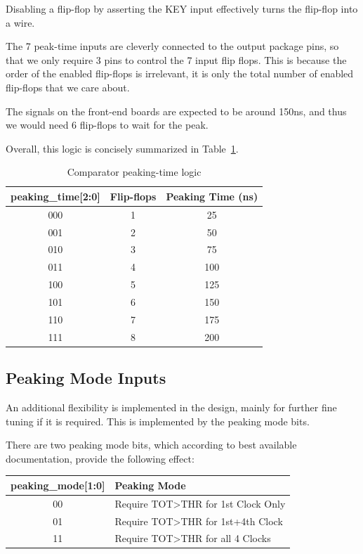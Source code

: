 \documentclass[letterpaper]{article}
\begin{document}
Disabling a flip-flop by asserting the KEY input effectively turns the flip-flop into a wire.

The 7 peak-time inputs are cleverly connected to the output package pins, so that we only require 3 pins to control the 7 input flip flops. This is because the order of the enabled flip-flops is irrelevant, it is only the total number of enabled flip-flops that we care about.

The signals on the front-end boards are expected to be around 150ns, and thus we would need 6 flip-flops to wait for the peak.

Overall, this logic is concisely summarized in Table~\ref{tab:pktime}.

\begin{table}[H]
\begin{center}
\begin{tabular}{ c   c   c }
\textbf{peaking\_{}time[2:0]} & \textbf{Flip-flops} & \textbf{Peaking Time (ns)} \\
\midrule
000 & 1 & 25 \\
001 & 2 & 50 \\
010 & 3 & 75 \\
011 & 4 & 100 \\
100 & 5 & 125 \\
101 & 6 & 150 \\
110 & 7 & 175 \\
111 & 8 & 200 \\
\end{tabular}
\end{center}
\caption{Comparator peaking-time logic}
\label{tab:pktime}
\end{table}


\subsection{Peaking Mode Inputs}\label{sec:pkmode}

An additional flexibility is implemented in the design, mainly for further fine tuning if it is required. This is implemented by the peaking mode bits.


There are two peaking mode bits, which according to best available documentation, provide the following effect:

\renewcommand{\arraystretch}{1.2}
\begin{table}[H]
\begin{center}
    \begin{tabular}{ c l }
        \textbf{peaking\_mode[1:0]} & \textbf{Peaking Mode} \\
        \midrule
        00 & Require TOT>THR for 1st Clock Only \\
        01 & Require TOT>THR for 1st+4th Clock  \\
        11 & Require TOT>THR for all 4 Clocks   \\
    \end{tabular}
\end{center}
\end{table}
\end{document}
